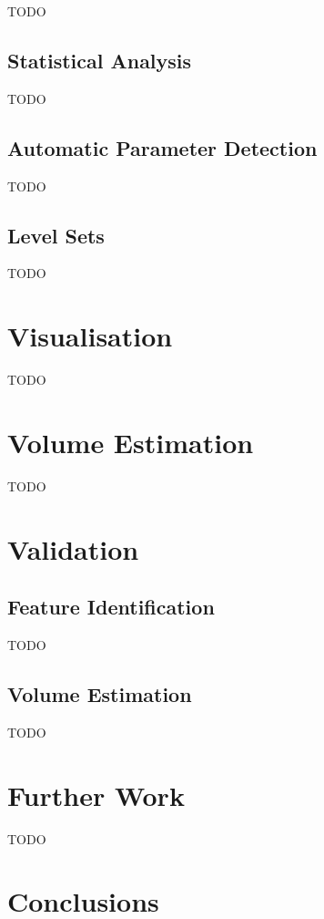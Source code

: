 \documentclass[preprint,a4paper]{elsarticle}
\begin{document}
TODO

\subsection{Statistical Analysis}

TODO

\subsection{Automatic Parameter Detection}

TODO

\subsection{Level Sets}

TODO

\section{Visualisation}

TODO

\section{Volume Estimation}

TODO

\section{Validation}

\subsection{Feature Identification}

TODO

\subsection{Volume Estimation}

TODO

\section{Further Work}

TODO

\section{Conclusions}
\end{document}
